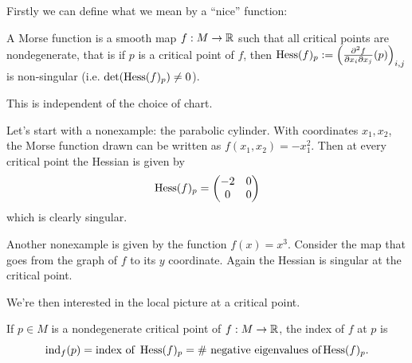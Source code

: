 \noindent Firstly we can define what we mean by a ``nice'' function:
\begin{defn}
    A Morse function is a smooth map $f: M \to \mathbb{R}$ such that all critical points are nondegenerate, that is if $p$ is a critical point of $f$, then 
    $\operatorname{Hess}(f)_p := \left( \frac{\partial^2 f}{\partial x_i \partial x_j}(p)\right)_{i,j}$
    is non-singular (i.e. $\text{det}(\operatorname{Hess}(f)_p)\neq 0$).
\end{defn}
\begin{rem}
    This is independent of the choice of chart. 
\end{rem}

\begin{ex}
    Let's start with a nonexample: the parabolic cylinder.
    \noindent With coordinates $x_1, x_2$, the Morse function drawn can be written as $f(x_1, x_2) = -x_1^2$.
    \noindent Then at every critical point the Hessian is given by
    \begin{equation}
        \operatorname{Hess}(f)_p = \begin{pmatrix}
            -2 & 0 \\
            0 & 0 
        \end{pmatrix}   
    \end{equation}
    which is clearly singular.

    \noindent Another nonexample is given by the function $f(x) = x^3$. Consider the map that goes from the graph of $f$ to its $y$ coordinate. Again the Hessian is singular at the critical point.
\end{ex}


\noindent We're then interested in the local picture at a critical point.

\begin{defn}
    If $p \in M$ is a nondegenerate critical point of $f : M \to \mathbb{R}$, the index of $f$ at $p$ is 
    \begin{equation}
        \operatorname{ind}_f (p) = \text{index of }\operatorname{Hess}(f)_p = \# \text{ negative eigenvalues of} \operatorname{Hess}(f)_p .
    \end{equation}
\end{defn}

